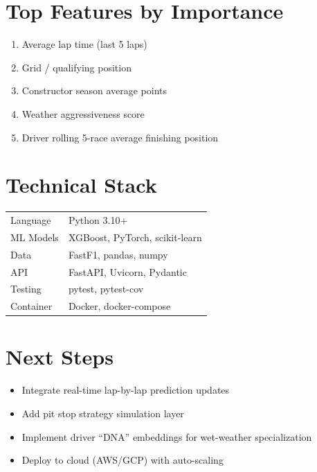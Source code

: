 \documentclass[12pt,a4paper]{article}
\begin{document}
\section{Top Features by Importance}

\begin{enumerate}
    \item Average lap time (last 5 laps)
    \item Grid / qualifying position
    \item Constructor season average points
    \item Weather aggressiveness score
    \item Driver rolling 5-race average finishing position
\end{enumerate}

\section{Technical Stack}

\begin{tabular}{ll}
Language    & Python 3.10+ \\
ML Models   & XGBoost, PyTorch, scikit-learn \\
Data        & FastF1, pandas, numpy \\
API         & FastAPI, Uvicorn, Pydantic \\
Testing     & pytest, pytest-cov \\
Container   & Docker, docker-compose \\
\end{tabular}

\section{Next Steps}

\begin{itemize}
    \item Integrate real-time lap-by-lap prediction updates
    \item Add pit stop strategy simulation layer
    \item Implement driver ``DNA'' embeddings for wet-weather specialization
    \item Deploy to cloud (AWS/GCP) with auto-scaling
\end{itemize}
\end{document}

